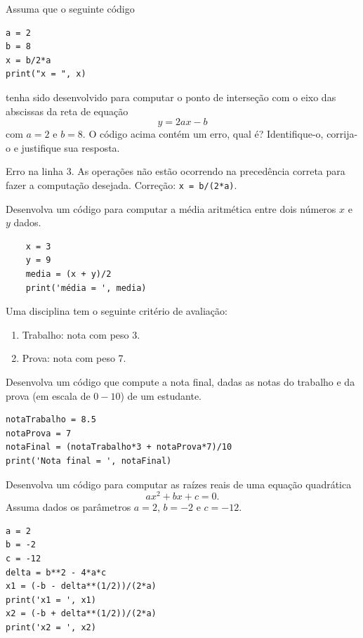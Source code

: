\begin{exer}
  Assuma que o seguinte código {\python}
\begin{lstlisting}
a = 2
b = 8
x = b/2*a
print("x = ", x)
\end{lstlisting}
  tenha sido desenvolvido para computar o ponto de interseção com o eixo das abscissas da reta de equação
  \begin{equation}
    y = 2ax - b
  \end{equation}
  com $a=2$ e $b=8$. O código acima contém um erro, qual é? Identifique-o, corrija-o e justifique sua resposta.
\end{exer}
\begin{resp}
  Erro na linha 3. As operações não estão ocorrendo na precedência correta para fazer a computação desejada. Correção: \lstinline+x = b/(2*a)+.
\end{resp}

\begin{exer}
  Desenvolva um código {\python} para computar a média aritmética entre dois números $x$ e $y$ dados.
\end{exer}
\begin{resp}
  \begin{lstlisting}
    x = 3
    y = 9
    media = (x + y)/2
    print('média = ', media)
\end{lstlisting}
\end{resp}

\begin{exer}
  Uma disciplina tem o seguinte critério de avaliação:
  \begin{enumerate}
  \item Trabalho: nota com peso 3.
  \item Prova: nota com peso 7.
  \end{enumerate}
  Desenvolva um código {\python} que compute a nota final, dadas as notas do trabalho e da prova (em escala de $0 - 10$) de um estudante.
\end{exer}
\begin{resp}
\begin{lstlisting}
notaTrabalho = 8.5
notaProva = 7
notaFinal = (notaTrabalho*3 + notaProva*7)/10
print('Nota final = ', notaFinal)
\end{lstlisting}
\end{resp}

\begin{exer}
  Desenvolva um código {\python} para computar as raízes reais de uma equação quadrática
  \begin{equation}
    ax^2 + bx + c = 0.
  \end{equation}
  Assuma dados os parâmetros $a=2$, $b=-2$ e $c=-12$.
\end{exer}
\begin{resp}
\begin{lstlisting}
a = 2
b = -2
c = -12
delta = b**2 - 4*a*c
x1 = (-b - delta**(1/2))/(2*a)
print('x1 = ', x1)
x2 = (-b + delta**(1/2))/(2*a)
print('x2 = ', x2)
\end{lstlisting}
\end{resp}

